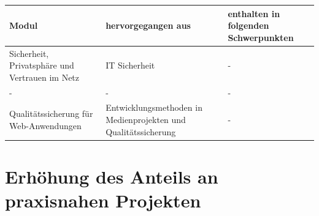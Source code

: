 \begin{longtable}[c]{@{}lll@{}}
\toprule
\begin{minipage}[b]{0.33\columnwidth}\raggedright\strut
Modul
\strut\end{minipage} &
\begin{minipage}[b]{0.33\columnwidth}\raggedright\strut
hervorgegangen aus
\strut\end{minipage} &
\begin{minipage}[b]{0.33\columnwidth}\raggedright\strut
enthalten in folgenden Schwerpunkten
\strut\end{minipage}\tabularnewline
\midrule
\endhead
\begin{minipage}[t]{0.33\columnwidth}\raggedright\strut
Sicherheit, Privatsphäre und Vertrauen im Netz
\strut\end{minipage} &
\begin{minipage}[t]{0.33\columnwidth}\raggedright\strut
IT Sicherheit
\strut\end{minipage} &
\begin{minipage}[t]{0.33\columnwidth}\raggedright\strut
-
\strut\end{minipage}\tabularnewline
\begin{minipage}[t]{0.33\columnwidth}\raggedright\strut
-
\strut\end{minipage} &
\begin{minipage}[t]{0.33\columnwidth}\raggedright\strut
-
\strut\end{minipage} &
\begin{minipage}[t]{0.33\columnwidth}\raggedright\strut
-
\strut\end{minipage}\tabularnewline
\begin{minipage}[t]{0.33\columnwidth}\raggedright\strut
Qualitätssicherung für Web-Anwendungen
\strut\end{minipage} &
\begin{minipage}[t]{0.33\columnwidth}\raggedright\strut
Entwicklungsmethoden in Medienprojekten und Qualitätssicherung
\strut\end{minipage} &
\begin{minipage}[t]{0.33\columnwidth}\raggedright\strut
-
\strut\end{minipage}\tabularnewline
\bottomrule
\end{longtable}

\section{Erhöhung des Anteils an praxisnahen
Projekten}\label{erhuxf6hung-des-anteils-an-praxisnahen-projekten}

